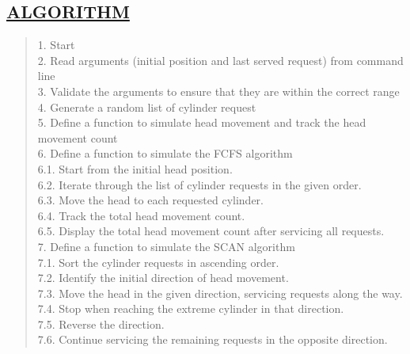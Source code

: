 \documentclass[a4paper, 12pt]{article}
\begin{document}
\subsection*{\underline{ALGORITHM}}
\begin{quote}
1. Start\\
2. Read arguments (initial position and last served request) from command line\\
3. Validate the arguments to ensure that they are within the correct range\\
4. Generate a random list of cylinder request\\
5. Define a function to simulate head movement and track the head movement count\\
6. Define a function to simulate the FCFS algorithm  \\
\hspace*{1cm} 6.1. Start from the initial head position.  \\
\hspace*{1cm} 6.2. Iterate through the list of cylinder requests in the given order.  \\
\hspace*{1cm} 6.3. Move the head to each requested cylinder.  \\
\hspace*{1cm} 6.4. Track the total head movement count.  \\
\hspace*{1cm} 6.5. Display the total head movement count after servicing all requests.  \\
7. Define a function to simulate the SCAN algorithm  \\
\hspace*{1cm} 7.1. Sort the cylinder requests in ascending order.  \\
\hspace*{1cm} 7.2. Identify the initial direction of head movement.  \\
\hspace*{1cm} 7.3. Move the head in the given direction, servicing requests along the way.  \\
\hspace*{1cm} 7.4. Stop when reaching the extreme cylinder in that direction.  \\
\hspace*{1cm} 7.5. Reverse the direction.  \\
\hspace*{1cm} 7.6. Continue servicing the remaining requests in the opposite direction.  \\

\end{quote}
\end{document}
